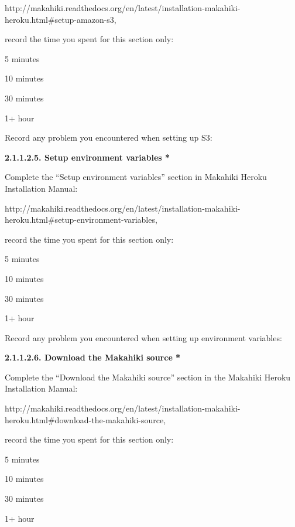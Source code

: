 http://makahiki.readthedocs.org/en/latest/installation-makahiki-heroku.html\#setup-amazon-s3, 

record the time you spent for this section only:

\begin{radiobutton}
\item 5 minutes
\item  10 minutes
\item  30 minutes
\item  1+ hour
\end{radiobutton}

Record any problem you encountered when setting up S3: \underline{\hspace{4cm}}

{\bf 2.1.1.2.5. Setup environment variables *}

Complete the ``Setup environment variables'' section in Makahiki Heroku Installation Manual:

http://makahiki.readthedocs.org/en/latest/installation-makahiki-heroku.html\#setup-environment-variables, 

record the time you spent for this section only:

\begin{radiobutton}
\item 5 minutes
\item  10 minutes
\item  30 minutes
\item  1+ hour
\end{radiobutton}

Record any problem you encountered when setting up environment variables: \underline{\hspace{2cm}}

{\bf 2.1.1.2.6. Download the Makahiki source *}

Complete the ``Download the Makahiki source'' section in the Makahiki Heroku Installation Manual:

http://makahiki.readthedocs.org/en/latest/installation-makahiki-heroku.html\#download-the-makahiki-source, 

record the time you spent for this section only:

\begin{radiobutton}
\item 5 minutes
\item  10 minutes
\item  30 minutes
\item  1+ hour
\end{radiobutton}


